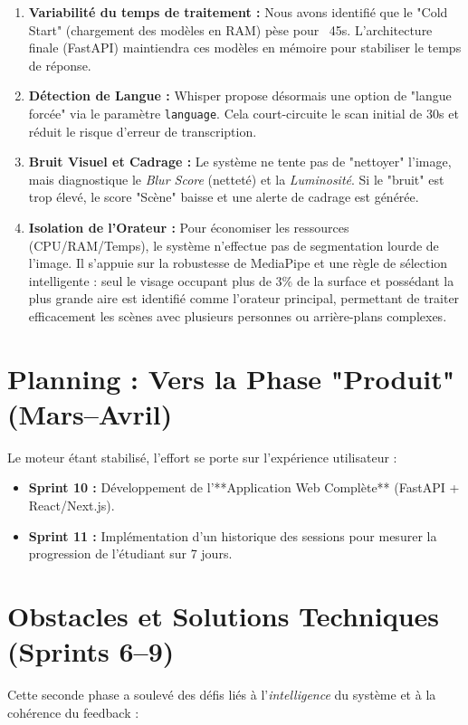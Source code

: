 \documentclass[12pt,a4paper]{article}
\begin{document}
\begin{enumerate}
    \item \textbf{Variabilité du temps de traitement :} Nous avons identifié que le "Cold Start" (chargement des modèles en RAM) pèse pour ~45s. L'architecture finale (FastAPI) maintiendra ces modèles en mémoire pour stabiliser le temps de réponse.
    \item \textbf{Détection de Langue :} Whisper propose désormais une option de "langue forcée" via le paramètre \texttt{language}. Cela court-circuite le scan initial de 30s et réduit le risque d'erreur de transcription.
    \item \textbf{Bruit Visuel et Cadrage :} Le système ne tente pas de "nettoyer" l'image, mais diagnostique le \textit{Blur Score} (netteté) et la \textit{Luminosité}. Si le "bruit" est trop élevé, le score "Scène" baisse et une alerte de cadrage est générée.
    \item \textbf{Isolation de l'Orateur :} Pour économiser les ressources (CPU/RAM/Temps), le système n'effectue pas de segmentation lourde de l'image. Il s'appuie sur la robustesse de MediaPipe et une règle de sélection intelligente : seul le visage occupant plus de 3\% de la surface et possédant la plus grande aire est identifié comme l'orateur principal, permettant de traiter efficacement les scènes avec plusieurs personnes ou arrière-plans complexes.
\end{enumerate}

\section{Planning : Vers la Phase "Produit" (Mars--Avril)}
Le moteur étant stabilisé, l'effort se porte sur l'expérience utilisateur :
\begin{itemize}
    \item \textbf{Sprint 10 :} Développement de l'**Application Web Complète** (FastAPI + React/Next.js).
    \item \textbf{Sprint 11 :} Implémentation d'un historique des sessions pour mesurer la progression de l'étudiant sur 7 jours.
\end{itemize}

\section{Obstacles et Solutions Techniques (Sprints 6--9)}
Cette seconde phase a soulevé des défis liés à l'\textit{intelligence} du système et à la cohérence du feedback :
\end{document}
